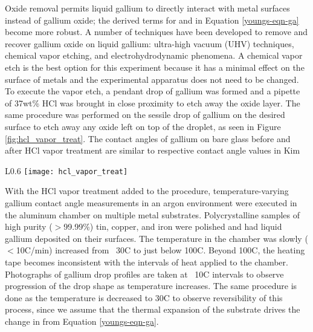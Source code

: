 Oxide removal permits liquid gallium to directly interact with metal surfaces instead of gallium oxide; the derived terms for \gamSL and \gamLV in Equation \ref{youngs-eqn-ga} become more robust. A number of techniques have been developed to remove and recover gallium oxide on liquid gallium: ultra-high vacuum (UHV) techniques,\cite{Regan1995,Regan1997} chemical vapor etching,\cite{Kim2013,Doudrick2014} and electrohydrodynamic phenomena.\cite{Khan2014} A chemical vapor etch is the best option for this experiment because it has a minimal effect on the surface of metals and the experimental apparatus does not need to be changed. To execute the vapor etch, a pendant drop of gallium was formed and a pipette of 37wt\% HCl was brought in close proximity to etch away the oxide layer. The same procedure was performed on the sessile drop of gallium on the desired surface to etch away any oxide left on top of the droplet, as seen in Figure \ref{fig:hcl_vapor_treat}. The contact angles of gallium on bare glass before and after HCl vapor treatment are similar to respective contact angle values in Kim \etal\cite{Kim2013}

\begin{wrapfigure}[8]{L}{0.6\linewidth}
	\centering
	\texttt{[image: hcl\_vapor\_treat]}
	\caption{This image shows the contact angle of gallium on a Galfenol sample in an argon environment before and after HCl vapor treatment.}
	\label{fig:hcl_vapor_treat}
\end{wrapfigure}

With the HCl vapor treatment added to the procedure, temperature-varying gallium contact angle measurements in an argon environment were executed in the aluminum chamber on multiple metal substrates. Polycrystalline samples of high purity ($>$99.99\%) tin, copper, and iron were polished and had liquid gallium deposited on their surfaces. The temperature in the chamber was slowly ($<$10\degree C/min) increased from ~30\degree C to just below 100\degree C. Beyond 100\degree C, the heating tape becomes inconsistent with the intervals of heat applied to the chamber. Photographs of gallium drop profiles are taken at ~10\degree C intervals to observe progression of the drop shape as temperature increases. The same procedure is done as the temperature is decreased to 30\degree C to observe reversibility of this process, since we assume that the thermal expansion of the substrate drives the change in \gamSL from Equation \ref{youngs-eqn-ga}. 

